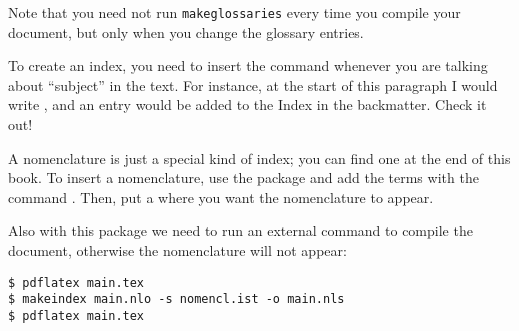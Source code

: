 Note that you need not run \texttt{makeglossaries} every time you 
compile your document, but only when you change the glossary entries.

To create an index, you need to insert the command 
 whenever you are talking about 
\enquote{subject} in the text. For instance, at the start of this 
paragraph I would write , and an entry would be 
added to the Index in the backmatter. Check it out!


A nomenclature is just a special kind of index; you can find one at the 
end of this book. To insert a nomenclature, use the package 
 and add the terms with the command 
. Then, put a  where 
you want the nomenclature to appear.

Also with this package we need to run an external command to compile the 
document, otherwise the nomenclature will not appear:

\begin{lstlisting}[style=kaolstplain]
$ pdflatex main.tex
$ makeindex main.nlo -s nomencl.ist -o main.nls
$ pdflatex main.tex
\end{lstlisting}

